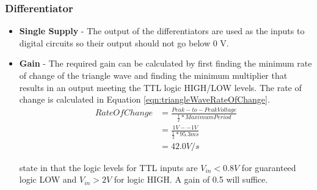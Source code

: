 \subsubsection{Differentiator}
\label{sec:specificationDifferentiator}
\begin{itemize}
    \item \textbf{Single Supply} - The output of the differentiators are used as the inputs to digital circuits so their output should not go below 0 V.

    \item \textbf{Gain} - The required gain can be calculated by first finding the minimum rate of change of the triangle wave and finding the minimum multiplier that results in an output meeting the TTL logic HIGH/LOW levels.
    The rate of change is calculated in Equation \ref{eqn:triangleWaveRateOfChange}.
    \begin{equation}
        \begin{split}
            Rate Of Change  &= \frac{Peak-to-Peak Voltage}{\frac{1}{2}*Maximum Period}\\
                            &= \frac{1 V - -1V}{\frac{1}{2}*95.3 ms}\\
                            &= 42.0 V/s
        \end{split}
        \label{eqn:triangleWaveRateOfChange}
    \end{equation} 

    \citeauthor{TTLLogicLevels} state in  that the logic levels for TTL inputs are $V_{in} < 0.8 V$ for guaranteed logic LOW and $V_{in} > 2 V$ for logic HIGH.
    A gain of 0.5 will suffice.

\end{itemize}
